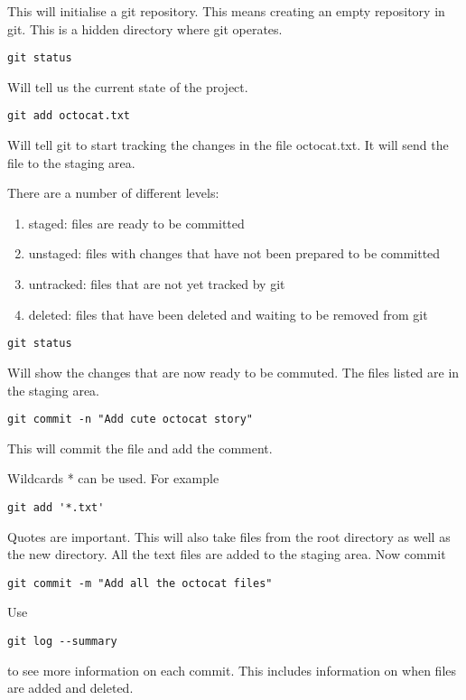 \documentclass[11pt]{article} %
\begin{document}
This will initialise a git repository. This means creating an empty repository in git.  This is a hidden directory where git operates. 

\begin{lstlisting}
git status
\end{lstlisting}

Will tell us the current state of the project. 

\begin{lstlisting}
git add octocat.txt 
\end{lstlisting}

Will tell git to start tracking the changes in the file octocat.txt.  It will send the file to the staging area. 

There are a number of different levels: 
\begin{enumerate}
\item staged:  files are ready to be committed
\item unstaged: files with changes that have not been prepared to be committed
\item untracked: files that are not yet tracked by git
\item deleted:  files that have been deleted and waiting to be removed from git
\end{enumerate}

 \begin{lstlisting}
git status 
\end{lstlisting}
 Will show the changes that are now ready to be commuted.  The files listed are in the staging area. 

\begin{lstlisting}
git commit -n "Add cute octocat story" 
\end{lstlisting}

This will commit the file and add the comment. 

Wildcards * can be used.  For example 
\begin{lstlisting}
git add '*.txt' 
\end{lstlisting}
Quotes are important.  This will also take files from the root directory as well as the new directory.  All the text files are added to the staging area. Now commit
\begin{lstlisting}
git commit -m "Add all the octocat files" 
\end{lstlisting}

Use 
\begin{lstlisting}
git log --summary 
\end{lstlisting}
to see more information on each commit.  This includes information on when files are added and deleted. 
\end{document}
